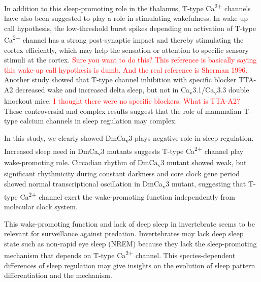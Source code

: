 In addition to this sleep-promoting role in the thalamus, T-type Ca\textsuperscript{2+} channels have also been suggested to play a role in stimulating wakefulness.
In wake-up call hypothesis, the low-threshold burst spikes depending on activation of T-type Ca\textsuperscript{2+} channel has a strong post-synaptic impact and thereby stimulating the cortex efficiently\cite{swadlow:2001aa}, which may help the sensation or attention to specific sensory stimuli at the cortex.
\textcolor{red}{Sure you want to do this? This reference is basically saying this wake-up call hypothesis is dumb. And the real reference is Sherman 1996.}
Another study showed that T-type channel inhibition with specific blocker TTA-A2 decreased wake and increased delta sleep, but not in Ca\textsubscript{v}3.1/Ca\textsubscript{v}3.3 double knockout mice\cite{kraus:2010aa}.
\textcolor{red}{I thought there were no specific blockers. What is TTA-A2?}
These controversial and complex results suggest that the role of mammalian T-type calcium channels in sleep regulation may complex. 

In this study, we clearly showed DmCa\textsubscript{v}3 plays negative role in sleep regulation.
Increased sleep need in DmCa\textsubscript{v}3 mutants suggests T-type Ca\textsuperscript{2+} channel play wake-promoting role.
Circadian rhythm of DmCa\textsubscript{v}3 mutant showed weak, but significant rhythmicity during constant darkness and core clock gene period showed normal transcriptional oscillation in DmCa\textsubscript{v}3 mutant, suggesting that T-type Ca\textsuperscript{2+} channel exert the wake-promoting function independently from molecular clock system.

This wake-promoting function and lack of deep sleep in invertebrate seems to be relevant for surveillance against predation.
Invertebrates may lack deep sleep state such as non-rapid eye sleep (NREM) because they lack the sleep-promoting mechanism that depends on T-type Ca\textsuperscript{2+} channel.
This species-dependent differences of sleep regulation may give insights on the evolution of sleep pattern differentiation and the mechanism.
  
  
  
  
  
  
  
  